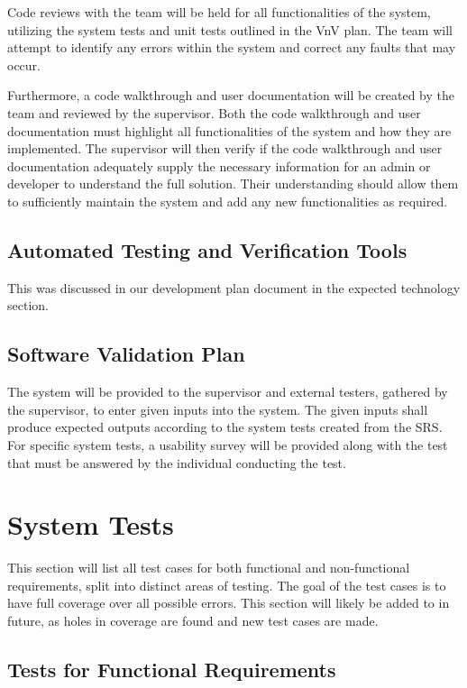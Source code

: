 \documentclass[12pt, titlepage]{article}
\begin{document}
Code reviews with the team will be held for all functionalities of the system, utilizing the
system tests and unit tests outlined in the VnV plan. The team will attempt to identify any
errors within the system and correct any faults that may occur.

Furthermore, a code walkthrough and user documentation will be created by the team and
reviewed by the supervisor. Both the code walkthrough and user documentation must highlight
all functionalities of the system and how they are implemented. The supervisor will then
verify if the code walkthrough and user documentation adequately supply the necessary
information for an admin or developer to understand the full solution. Their understanding
should allow them to sufficiently maintain the system and add any new functionalities as
required.

\subsection{Automated Testing and Verification Tools}

This was discussed in our development plan document \cite{DP} 
in the expected technology section.

\subsection{Software Validation Plan}

The system will be provided to the supervisor and external testers, gathered by the supervisor,
to enter given inputs into the system. The given inputs shall produce expected outputs according to
the system tests created from the SRS. For specific system tests, a usability survey will be
provided along with the test that must be answered by the individual conducting the test.

\section{System Tests}

This section will list all test cases for both functional and non-functional
requirements, split into distinct areas of testing. The goal of the test cases
is to have full coverage over all possible errors. This section will likely be
added to in future, as holes in coverage are found and new test cases are
made.

\subsection{Tests for Functional Requirements}
\end{document}
